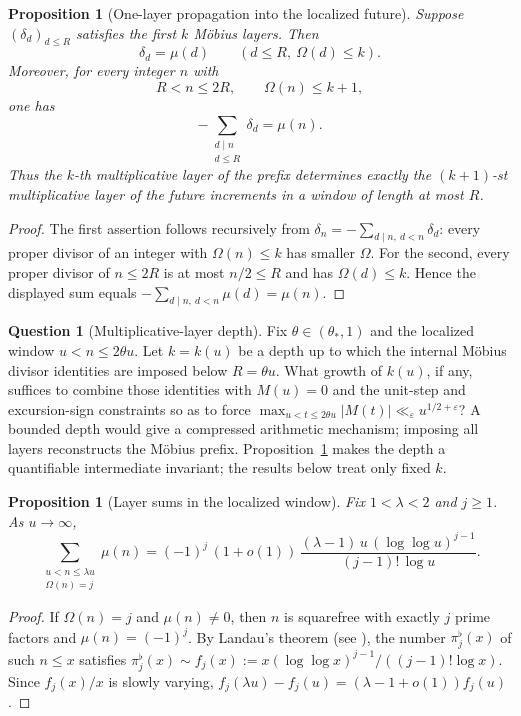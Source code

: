 \documentclass[11pt]{amsart}
\numberwithin{equation}{section}
\theoremstyle{plain}
\newtheorem{proposition}[theorem]{Proposition}
\theoremstyle{definition}
\newtheorem{question}[theorem]{Question}
\theoremstyle{remark}
\newcommand{\eps}{\varepsilon}
\begin{document}
\begin{proposition}[One-layer propagation into the localized future]
\label{prop:layer-propagation}
Suppose $(\delta_d)_{d\le R}$ satisfies the first $k$ M\"obius layers. Then
\[
\delta_d=\mu(d)\qquad(d\le R,\ \Omega(d)\le k).
\]
Moreover, for every integer $n$ with
\[
R<n\le2R,\qquad\Omega(n)\le k+1,
\]
one has
\[
-\sum_{\substack{d\mid n\\d\le R}}\delta_d=\mu(n).
\]
Thus the $k$-th multiplicative layer of the prefix determines exactly the
$(k+1)$-st multiplicative layer of the future increments in a window of
length at most $R$.
\end{proposition}

\begin{proof}
The first assertion follows recursively from
$\delta_n=-\sum_{d\mid n,\ d<n}\delta_d$: every proper divisor of an
integer with $\Omega(n)\le k$ has smaller $\Omega$.  For the second, every
proper divisor of $n\le2R$ is at most $n/2\le R$ and has
$\Omega(d)\le k$.  Hence the displayed sum equals
$-\sum_{d\mid n,\ d<n}\mu(d)=\mu(n)$.
\end{proof}

\begin{question}[Multiplicative-layer depth]
\label{q:layer-depth}
Fix $\theta\in(\theta_*,1)$ and the localized window $u<n\le2\theta u$.
Let $k=k(u)$ be a depth up to which the internal M\"obius divisor identities
are imposed below $R=\theta u$. What growth of $k(u)$, if any, suffices to
combine those identities with $M(u)=0$ and the unit-step and excursion-sign
constraints so as to force
$\max_{u<t\le2\theta u}|M(t)|\ll_\eps u^{1/2+\eps}$? A bounded depth would
give a compressed arithmetic mechanism; imposing all layers reconstructs the
M\"obius prefix. Proposition~\ref{prop:layer-propagation} makes the depth a
quantifiable intermediate invariant; the results below treat only fixed
$k$.
\end{question}
\begin{proposition}[Layer sums in the localized window]
\label{prop:layer-sums}
Fix $1<\lambda<2$ and $j\ge1$. As $u\to\infty$,
\begin{equation}
\label{eq:layer-sum}
\sum_{\substack{u<n\le\lambda u\\ \Omega(n)=j}}\mu(n)
=(-1)^j\,(1+o(1))\,\frac{(\lambda-1)\,u\,(\log\log u)^{j-1}}{(j-1)!\,\log u}.
\end{equation}
\end{proposition}

\begin{proof}
If $\Omega(n)=j$ and $\mu(n)\ne0$, then $n$ is squarefree with exactly $j$
prime factors and $\mu(n)=(-1)^j$. By Landau's theorem (see
\cite[Ch.~7]{MontgomeryVaughan2007}), the number $\pi_j^\flat(x)$ of such
$n\le x$ satisfies $\pi_j^\flat(x)\sim f_j(x):=x(\log\log x)^{j-1}/((j-1)!\log x)$.
Since $f_j(x)/x$ is slowly varying, $f_j(\lambda u)-f_j(u)=(\lambda-1+o(1))f_j(u)$.
\end{proof}
\end{document}
